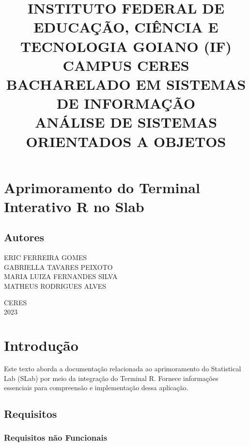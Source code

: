 \documentclass{article}
\begin{document}
\title{INSTITUTO FEDERAL DE EDUCAÇÃO, CIÊNCIA E TECNOLOGIA GOIANO (IF)\\ CAMPUS CERES\\ BACHARELADO EM SISTEMAS DE INFORMAÇÃO\\ANÁLISE DE SISTEMAS ORIENTADOS A OBJETOS}
\doublespacing
\date{}
\maketitle
\vspace{50pt}

\section*{Aprimoramento do Terminal Interativo R no Slab}
\vspace{70pt}

\begin{center}
\large
\section*{Autores} 
 ERIC FERREIRA GOMES\\
 GABRIELLA TAVARES PEIXOTO\\
 MARIA LUIZA FERNANDES SILVA\\
 MATHEUS RODRIGUES ALVES\\
 \vspace{60pt}
 
{CERES\\2023}
\vspace{70pt}

\tableofcontents
\end{center}
\vspace{450pt}

\section{Introdução}
{Este texto aborda a documentação relacionada ao aprimoramento do Statistical Lab (SLab) por meio da integração do Terminal R. Fornece informações essenciais para compreensão e implementação dessa aplicação.}
\vspace{10pt}

\subsection{Requisitos}
\vspace{10pt}

\subsubsection{Requisitos não Funcionais}
\vspace{10pt}
\end{document}

